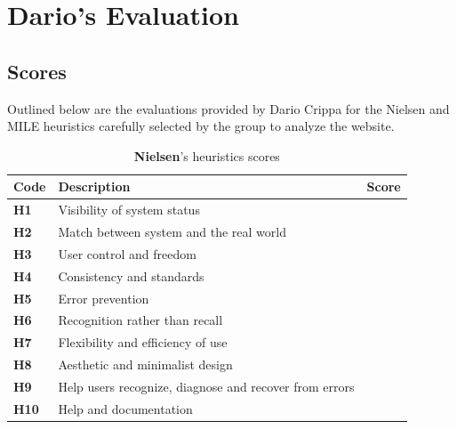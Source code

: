 \section{Dario's Evaluation}
\subsection{Scores}
Outlined below are the evaluations provided by Dario Crippa for the Nielsen and MILE heuristics carefully selected by the group to analyze the website.\\
\begin{table}[htp!]
    \centering
    \begin{tabular}{ |l|l|c| }
        \hline
        \textbf{Code} & \textbf{Description} & \textbf{Score}\\
        \hline
        \textbf{H1} & Visibility of system status & \textbf{\color{unicefOrange}{3}}\\
        \hline
        \textbf{H2} & Match between system and the real world & \textbf{\color{unicefGreen}{5}}\\
        \hline
        \textbf{H3} & User control and freedom & \textbf{\color{unicefRed}{2}}\\
        \hline
        \textbf{H4} & Consistency and standards & \textbf{\color{unicefGreen}{5}}\\
        \hline
        \textbf{H5} & Error prevention & \textbf{\color{unicefGreen}{4}}\\
        \hline
        \textbf{H6} & Recognition rather than recall & \textbf{\color{unicefGreen}{5}}\\
        \hline
        \textbf{H7} & Flexibility and efficiency of use & \textbf{\color{unicefOrange}{3}}\\
        \hline
        \textbf{H8} & Aesthetic and minimalist design & \textbf{\color{unicefOrange}{3}}\\
        \hline
        \textbf{H9} & Help users recognize, diagnose and recover from errors & \textbf{\color{unicefGray}{n.a}}\\
        \hline
        \textbf{H10} & Help and documentation & \textbf{\color{unicefGreen}{4}}\\
        \hline
    \end{tabular}
    \caption{\textbf{Nielsen}'s heuristics scores}
\end{table}
